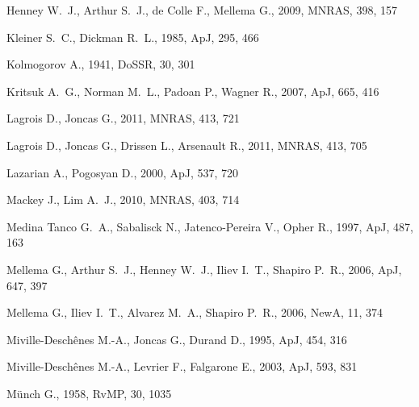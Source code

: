 \documentclass[useAMS,usenatbib]{mn2e}
\begin{document}
\begin{thebibliography}{}
Henney W.~J., Arthur S.~J., de Colle F., Mellema G., 2009, MNRAS, 398, 157 

 Kleiner S.~C., Dickman R.~L., 1985, ApJ, 295, 466 

Kolmogorov A., 1941, DoSSR, 30, 301 

 Kritsuk A.~G., Norman M.~L., Padoan
  P., Wagner R., 2007, ApJ, 665, 416 

 Lagrois D., Joncas G., 2011, MNRAS, 413, 721 

 Lagrois D., Joncas G., Drissen L., 
Arsenault R., 2011, MNRAS, 413, 705 

 Lazarian A., Pogosyan D., 2000, ApJ, 537, 720 

 Mackey J., Lim A.~J., 2010, MNRAS, 403, 714 

 Medina Tanco G.~A., Sabalisck N., 
Jatenco-Pereira V., Opher R., 1997, ApJ, 487, 163 


 Mellema G., Arthur S.~J., Henney W.~J., 
Iliev I.~T., Shapiro P.~R., 2006, ApJ, 647, 397 

 Mellema G., Iliev I.~T., Alvarez M.~A., 
Shapiro P.~R., 2006, NewA, 11, 374 

 Miville-Desch{\^e}nes M.-A., Joncas G., Durand D., 1995, ApJ, 454, 316 

 Miville-Desch{\^e}nes M.-A., Levrier F., Falgarone E., 2003, ApJ, 593, 831 

M{\"u}nch G., 1958, RvMP, 30, 1035 


\end{thebibliography}
\end{document}

